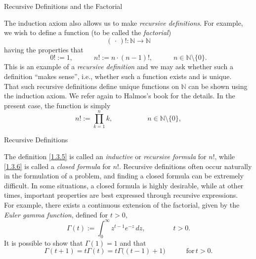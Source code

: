\documentclass[smaller,hyperref={CJKbookmarks=true}]{beamer}
\newcommand{\N}{\mathbb{N}} \newcommand{\Z}{\mathbb{Z}} \newcommand{\Q}{\mathbb{Q}}
\begin{document}
\begin{frame}[t]{Recursive Definitions and the Factorial}
\begin{spacing}{0.95}
The induction axiom also allows us to make \emph{recursive definitions}. For
example, we wish to define a function (to be called the \emph{factorial})
\[(\,\cdot\,)!\!:\N\to\N\]
having the properties that
\begin{equation}\label{1.3.5}
  0!:=1,\qquad\quad n!:=n\cdot(n-1)!,\qquad\quad
  n\in\N\setminus\{0\}.
\end{equation}
This is an example of a \emph{recursive definition} and we may ask whether such a
definition ``makes sense'', i.e., whether such a function \textcolor[rgb]{1.00,0.00,0.00}{exists} and is \textcolor[rgb]{1.00,0.00,0.00}{unique}.\\[4pt]
That such recursive definitions define unique functions on $\N$ can be shown
using the induction axiom. We refer again to Halmos's book for the
details. In the present case, the function is simply
\begin{equation}\label{1.3.6}
  n!:=\prod_{k=1}^{n}k,\qquad\qquad\quad
  n\in\N\setminus\{0\},
\end{equation}
\end{spacing}
\end{frame}
\begin{frame}[t]{Recursive Definitions}
\begin{spacing}{1.05}
The definition \eqref{1.3.5} is called an \emph{inductive} or \emph{recursive formula} for $n!$, while \eqref{1.3.6} is called a \emph{closed formula} for $n!$. Recursive definitions often
occur naturally in the formulation of a problem, and finding a closed
formula can be extremely difficult. In some situations, a closed formula is highly desirable, while at other times, important properties are best
expressed through recursive expressions.\\[4pt]
For example, there exists a continuous extension of the factorial, given by
the \emph{Euler gamma function}, defined for $t>0$,
\[\Gamma(t):=\int_{0}^{\infty}z^{t-1}e^{-z}\,dz,
\qquad\qquad t>0.\]
It is possible to show that $\Gamma(1)=1$ and that
\[\Gamma(t+1)=t\Gamma(t)=t\Gamma\big((t-1)+1\big)\qquad\quad
\text{for}\,t>0.\]
\end{spacing}
\end{frame}
\end{document}
